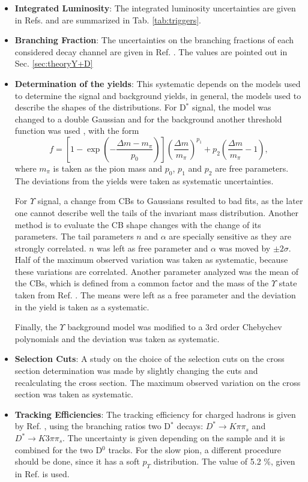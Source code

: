 \begin{itemize}
  \item \textbf{Integrated Luminosity}: The integrated luminosity uncertainties are given in Refs. \cite{CMS-PAS-LUM-17-001, CMS-PAS-LUM-17-004, CMS-PAS-LUM-18-002} and are summarized in Tab. \ref{tab:triggers}.
  \item \textbf{Branching Fraction}: The uncertainties on the branching fractions of each considered decay channel are given in Ref. \cite{Workman:2022ynf}. The values are pointed out in Sec. \ref{sec:theoryY+D}
  \item \textbf{Determination of the yields}: This systematic depends on the models used to determine the signal and background yields, in general, the models used to describe the shapes of the distributions. For D$^*$ signal, the model was changed to a double Gaussian and for the background another threshold function was used \cite{CMS:2021lab}, with the form
        \begin{equation}
          f = \left[ 1- \exp{\left( -\frac{\Delta m - m_\pi}{p_0} \right)} \right]\left( \frac{\Delta m}{m_\pi} \right)^{p_1} +p_2 \left( \frac
          {\Delta m}{m_\pi} - 1 \right),
        \end{equation}
        where $m_\pi$ is taken as the pion mass and $p_0$, $p_1$ and $p_2$ are free parameters. The deviations from the yields were taken as systematic uncertainties.

        For $\Upsilon$ signal, a change from CBs to Gaussians resulted to bad fits, as the later one cannot describe well the tails of the invariant mass distribution. Another method is to evaluate the CB shape changes with the change of its parameters. The tail parameters $n$ and $\alpha$ are specially sensitive as they are strongly correlated. $n$ was left as free parameter and $\alpha$ was moved by $\pm 2\sigma$. Half of the maximum observed variation was taken as systematic, because these variations are correlated. Another parameter analyzed was the mean of the CBs, which is defined from a common factor and the mass of the $\Upsilon$ state taken from Ref. \cite{Workman:2022ynf}. The means were left as a free parameter and the deviation in the yield is taken as a systematic.

        Finally, the $\Upsilon$ background model was modified to a 3rd order Chebychev polynomials and the deviation was taken as systematic.
  \item \textbf{Selection Cuts}: A study on the choice of the selection cuts on the cross section determination was made by slightly changing the cuts and recalculating the cross section. The maximum observed variation on the cross section was taken as systematic.
  \item \textbf{Tracking Efficiencies}: The tracking efficiency for charged hadrons is given by Ref. \cite{CMS-DP-2022-012}, using the branching ratios two D$^*$ decays: $D^* \rightarrow K\pi\pi_s$ and $D^* \rightarrow K3\pi\pi_s$. The uncertainty is given depending on the sample and it is combined for the two D$^0$ tracks. For the slow pion, a different procedure should be done, since it has a soft $p_T$ distribution. The value of 5.2 \%, given in Ref. \cite{CMS:2021lab} is used.
\end{itemize}

